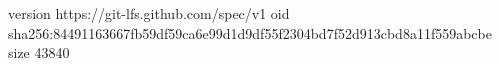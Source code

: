 version https://git-lfs.github.com/spec/v1
oid sha256:84491163667fb59df59ca6e99d1d9df55f2304bd7f52d913cbd8a11f559abcbe
size 43840
